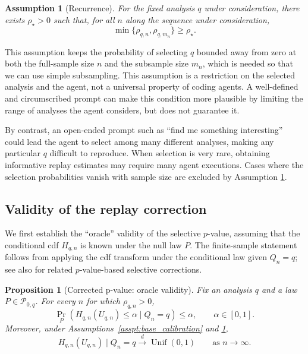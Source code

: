 \documentclass[10pt]{article}
\newtheorem{proposition}{Proposition}
\newtheorem{assumption}{Assumption}
\begin{document}
\begin{assumption}[Recurrence]
\label{asspt:recurrence}
For the fixed analysis $q$ under consideration, there exists $\rho_\star>0$ such that, for all $n$ along the sequence under consideration,
\[
\min\{\rho_{q,n},\rho_{q,m_n}\}\ge\rho_\star.
\]
\end{assumption}

This assumption keeps the probability of selecting $q$ bounded away from zero at both the full-sample size $n$ and the subsample size $m_n$, which is needed so that we can use simple subsampling. This assumption is a restriction on the selected analysis and the agent, not a universal property of coding agents. A well-defined and circumscribed prompt can make this condition more plausible by limiting the range of analyses the agent considers, but does not guarantee it.

By contrast, an open-ended prompt such as ``find me something interesting'' could lead the agent to select among many different analyses, making any particular $q$ difficult to reproduce. When selection is very rare, obtaining informative replay estimates may require many agent executions. Cases where the selection probabilities vanish with sample size are excluded by Assumption \ref{asspt:recurrence}.

\subsection{Validity of the replay correction}
\label{sec:asymptotic_validity}

We first establish the ``oracle'' validity of the selective $p$-value, assuming that the conditional cdf $H_{q,n}$ is known under the null law $P$. The finite-sample statement follows from applying the cdf transform under the conditional law given $Q_n=q$; see also \citet{sood2024selective} for related $p$-value-based selective corrections.

\begin{proposition}[Corrected p-value: oracle validity]
\label{prop:selected_rank_general}
Fix an analysis $q$ and a law $P\in\mathcal P_{0,q}$. For every $n$ for which $\rho_{q,n} > 0$,
\[
\Pr_P\!\left(
H_{q,n}(U_{q,n})\le\alpha
\mid Q_n=q
\right)\le\alpha,
\qquad \alpha\in[0,1].
\]
Moreover, under Assumptions~\ref{asspt:base_calibration} and \ref{asspt:recurrence},
\[
H_{q,n}(U_{q,n})\mid Q_n=q
\xrightarrow{d}\operatorname{Unif}(0,1)
\qquad\text{as }n\to\infty.
\]
\end{proposition}
\end{document}

